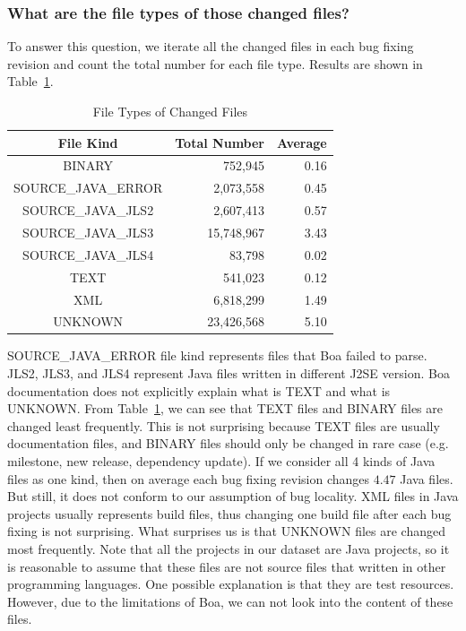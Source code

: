 \documentclass{sig-alternate-05-2015}
\begin{document}
\subsubsection*{What are the file types of those changed files?} \vspace{-0.3em}

To answer this question, we iterate all the changed files in each bug fixing
revision and count the total number for each file type. Results are shown in
Table~\ref{tbl:fileType}.

\begin{table}
\centering
  \begin{tabular}{| c | r | r |}
  \hline
  File Kind & Total Number & Average \\ \hline \hline
  BINARY & 752,945 & 0.16 \\ \hline
  SOURCE\_JAVA\_ERROR & 2,073,558 & 0.45 \\ \hline
  SOURCE\_JAVA\_JLS2 & 2,607,413 & 0.57 \\ \hline
  SOURCE\_JAVA\_JLS3 & 15,748,967 & 3.43 \\ \hline
  SOURCE\_JAVA\_JLS4 & 83,798 & 0.02 \\ \hline
  TEXT & 541,023 & 0.12 \\ \hline
  XML & 6,818,299 & 1.49 \\ \hline
  UNKNOWN & 23,426,568 & 5.10 \\ \hline
  \end{tabular}
  \caption{File Types of Changed Files}
  \label{tbl:fileType}
\end{table}

SOURCE\_JAVA\_ERROR file kind represents files that Boa failed to parse. JLS2,
JLS3, and JLS4 represent Java files written in different J2SE version. Boa
documentation does not explicitly explain what is TEXT and what is UNKNOWN. From
Table~\ref{tbl:fileType}, we can see that TEXT files and BINARY files are
changed least frequently. This is not surprising because TEXT files are usually
documentation files, and BINARY files should only be changed in rare case (e.g.
milestone, new release, dependency update). If we consider all 4 kinds of Java
files as one kind, then on average each bug fixing revision changes $4.47$ Java
files. But still, it does not conform to our assumption of bug locality. XML
files in Java projects usually represents build files, thus changing one build
file after each bug fixing is not surprising.  What surprises us is that UNKNOWN
files are changed most frequently. Note that all the projects in our dataset are
Java projects, so it is reasonable to assume that these files are not source
files that written in other programming languages.  One possible explanation is
that they are test resources. However, due to the limitations of Boa, we can not
look into the content of these files. 
\end{document}

